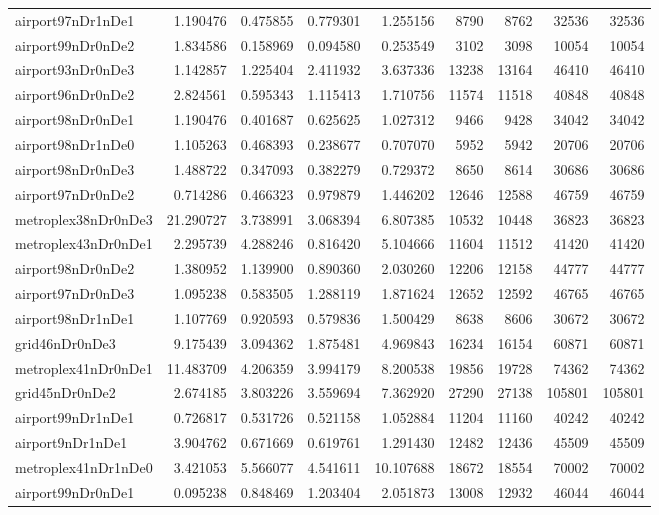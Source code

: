 \begin{longtable}{|l|r|r|r|r|r|r|r|r|}
airport97nDr1nDe1 & 1.190476 & 0.475855 & 0.779301 & 1.255156 & 8790 & 8762 & 32536 & 32536 \\
airport99nDr0nDe2 & 1.834586 & 0.158969 & 0.094580 & 0.253549 & 3102 & 3098 & 10054 & 10054 \\
airport93nDr0nDe3 & 1.142857 & 1.225404 & 2.411932 & 3.637336 & 13238 & 13164 & 46410 & 46410 \\
airport96nDr0nDe2 & 2.824561 & 0.595343 & 1.115413 & 1.710756 & 11574 & 11518 & 40848 & 40848 \\
airport98nDr0nDe1 & 1.190476 & 0.401687 & 0.625625 & 1.027312 & 9466 & 9428 & 34042 & 34042 \\
airport98nDr1nDe0 & 1.105263 & 0.468393 & 0.238677 & 0.707070 & 5952 & 5942 & 20706 & 20706 \\
airport98nDr0nDe3 & 1.488722 & 0.347093 & 0.382279 & 0.729372 & 8650 & 8614 & 30686 & 30686 \\
airport97nDr0nDe2 & 0.714286 & 0.466323 & 0.979879 & 1.446202 & 12646 & 12588 & 46759 & 46759 \\
metroplex38nDr0nDe3 & 21.290727 & 3.738991 & 3.068394 & 6.807385 & 10532 & 10448 & 36823 & 36823 \\
metroplex43nDr0nDe1 & 2.295739 & 4.288246 & 0.816420 & 5.104666 & 11604 & 11512 & 41420 & 41420 \\
airport98nDr0nDe2 & 1.380952 & 1.139900 & 0.890360 & 2.030260 & 12206 & 12158 & 44777 & 44777 \\
airport97nDr0nDe3 & 1.095238 & 0.583505 & 1.288119 & 1.871624 & 12652 & 12592 & 46765 & 46765 \\
airport98nDr1nDe1 & 1.107769 & 0.920593 & 0.579836 & 1.500429 & 8638 & 8606 & 30672 & 30672 \\
grid46nDr0nDe3 & 9.175439 & 3.094362 & 1.875481 & 4.969843 & 16234 & 16154 & 60871 & 60871 \\
metroplex41nDr0nDe1 & 11.483709 & 4.206359 & 3.994179 & 8.200538 & 19856 & 19728 & 74362 & 74362 \\
grid45nDr0nDe2 & 2.674185 & 3.803226 & 3.559694 & 7.362920 & 27290 & 27138 & 105801 & 105801 \\
airport99nDr1nDe1 & 0.726817 & 0.531726 & 0.521158 & 1.052884 & 11204 & 11160 & 40242 & 40242 \\
airport9nDr1nDe1 & 3.904762 & 0.671669 & 0.619761 & 1.291430 & 12482 & 12436 & 45509 & 45509 \\
metroplex41nDr1nDe0 & 3.421053 & 5.566077 & 4.541611 & 10.107688 & 18672 & 18554 & 70002 & 70002 \\
airport99nDr0nDe1 & 0.095238 & 0.848469 & 1.203404 & 2.051873 & 13008 & 12932 & 46044 & 46044 \\

\end{longtable}
